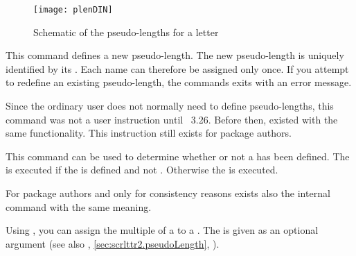 \begin{figure}
  \centering
  \texttt{[image: plenDIN]}
  \caption{Schematic of the pseudo-lengths for a letter}
  \label{fig:scrlttr2-experts.pseudoLength}
\end{figure}


\begin{Declaration}
\end{Declaration}
This command
defines a new pseudo-length. The new pseudo-length is uniquely identified by
its . Each name can therefore be assigned only once. If you
attempt to redefine an existing pseudo-length, the commands exits with an
error message.

%
Since the ordinary user does not normally need to define pseudo-lengths, this
command was not a user instruction until \KOMAScript~3.26. Before then,
 existed with the same functionality. This instruction still
exists for package authors.%
\EndIndexGroup


\begin{Declaration}
\end{Declaration}
This command can be
used to determine whether or not a  has been defined. The
 is executed if the  is defined and not
. Otherwise the  is executed.

%
For package authors and only for consistency reasons exists also the internal
command  with the same meaning.%
\EndIndexGroup


\begin{Declaration}
\end{Declaration}
Using , you can assign the multiple of a
 to a . The  is given as an
optional argument (see also ,
\autoref{sec:scrlttr2.pseudoLength},
).

